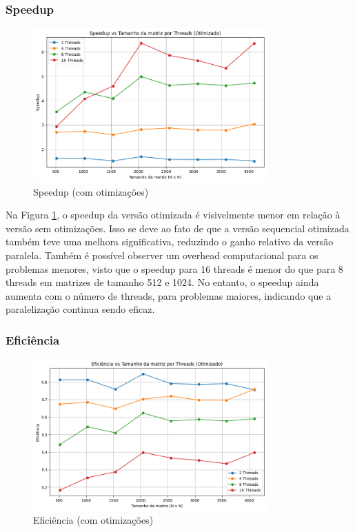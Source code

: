 \documentclass[12pt, a4paper]{article}
\begin{document}
	\subsubsection{Speedup}

	\begin{figure}[H]
		\centering
		\includegraphics[width=0.8\textwidth]{img/speedup-opt.png}
		\caption{Speedup (com otimizações)}
		\label{fig:speedup_otimizado}
	\end{figure}

	Na Figura \ref{fig:speedup_otimizado}, o speedup da versão otimizada é visivelmente menor em relação à versão sem otimizações. Isso se deve ao fato de que a versão sequencial otimizada também teve uma melhora significativa, reduzindo o ganho relativo da versão paralela. Também é possível observer um overhead computacional para os problemas menores, visto que o speedup para 16 threads é menor do que para 8 threads em matrizes de tamanho 512 e 1024. No entanto, o speedup ainda aumenta com o número de threads, para problemas maiores, indicando que a paralelização continua sendo eficaz.

	\subsubsection{Eficiência}

	\begin{figure}[H]
		\centering
		\includegraphics[width=0.8\textwidth]{img/efficiency-opt.png}
		\caption{Eficiência (com otimizações)}
		\label{fig:eficiencia_otimizado}
	\end{figure}
\end{document}
